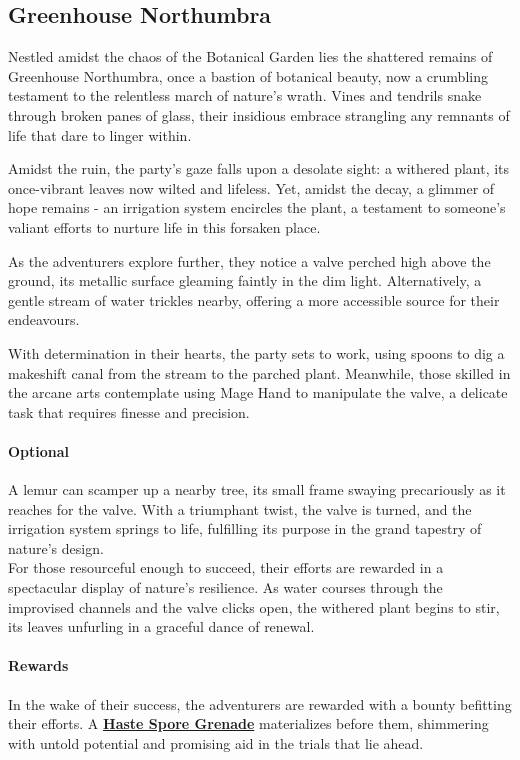 \subsection*{Greenhouse Northumbra}
Nestled amidst the chaos of the Botanical Garden lies the shattered remains of Greenhouse Northumbra, once a bastion of botanical beauty, now a crumbling testament to the relentless march of nature's wrath. Vines and tendrils snake through broken panes of glass, their insidious embrace strangling any remnants of life that dare to linger within.

Amidst the ruin, the party's gaze falls upon a desolate sight: a withered plant, its once-vibrant leaves now wilted and lifeless. Yet, amidst the decay, a glimmer of hope remains - an irrigation system encircles the plant, a testament to someone's valiant efforts to nurture life in this forsaken place.

As the adventurers explore further, they notice a valve perched high above the ground, its metallic surface gleaming faintly in the dim light. Alternatively, a gentle stream of water trickles nearby, offering a more accessible source for their endeavours.

With determination in their hearts, the party sets to work, using spoons to dig a makeshift canal from the stream to the parched plant. Meanwhile, those skilled in the arcane arts contemplate using Mage Hand to manipulate the valve, a delicate task that requires finesse and precision.

\paragraph*{Optional}
A lemur can scamper up a nearby tree, its small frame swaying precariously as it reaches for the valve. With a triumphant twist, the valve is turned, and the irrigation system springs to life, fulfilling its purpose in the grand tapestry of nature's design.\\

\noindent For those resourceful enough to succeed, their efforts are rewarded in a spectacular display of nature's resilience. As water courses through the improvised channels and the valve clicks open, the withered plant begins to stir, its leaves unfurling in a graceful dance of renewal.

\paragraph*{Rewards}
In the wake of their success, the adventurers are rewarded with a bounty befitting their efforts. A \hyperref[sec:HasteSporeGrenade]{\textbf{Haste Spore Grenade}} materializes before them, shimmering with untold potential and promising aid in the trials that lie ahead.


